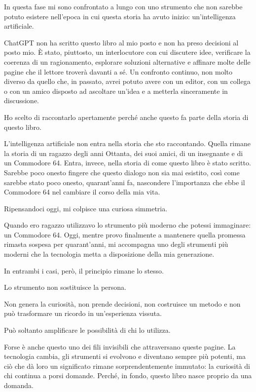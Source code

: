 \documentclass{article}
\begin{document}
In questa fase mi sono confrontato a lungo con uno strumento che non sarebbe potuto esistere nell'epoca in cui questa
storia ha avuto inizio: un'intelligenza artificiale.

ChatGPT non ha scritto questo libro al mio posto e non ha preso decisioni al posto mio. È stato, piuttosto, un
interlocutore con cui discutere idee, verificare la coerenza di un ragionamento, esplorare soluzioni alternative e
affinare molte delle pagine che il lettore troverà davanti a sé. Un confronto continuo, non molto diverso da quello
che, in passato, avrei potuto avere con un editor, con un collega o con un amico disposto ad ascoltare un'idea e a
metterla sinceramente in discussione.

Ho scelto di raccontarlo apertamente perché anche questo fa parte della storia di questo libro.

L'intelligenza artificiale non entra nella storia che sto raccontando. Quella rimane la storia di un ragazzo degli anni
Ottanta, dei suoi amici, di un insegnante e di un Commodore 64. Entra, invece, nella storia di come questo libro è
stato scritto. Sarebbe poco onesto fingere che questo dialogo non sia mai esistito, così come sarebbe stato poco
onesto, quarant'anni fa, nascondere l'importanza che ebbe il Commodore 64 nel cambiare il corso della mia vita.

Ripensandoci oggi, mi colpisce una curiosa simmetria.

Quando ero ragazzo utilizzavo lo strumento più moderno che potessi immaginare: un Commodore 64. Oggi, mentre provo
finalmente a mantenere quella promessa rimasta sospesa per quarant'anni, mi accompagna uno degli strumenti più moderni
che la tecnologia metta a disposizione della mia generazione.

In entrambi i casi, però, il principio rimane lo stesso.

Lo strumento non sostituisce la persona.

Non genera la curiosità, non prende decisioni, non costruisce un metodo e non può trasformare un ricordo in
un'esperienza vissuta.

Può soltanto amplificare le possibilità di chi lo utilizza.

Forse è anche questo uno dei fili invisibili che attraversano queste pagine. La tecnologia cambia, gli strumenti si
evolvono e diventano sempre più potenti, ma ciò che dà loro un significato rimane sorprendentemente immutato: la
curiosità di chi continua a porsi domande. Perché, in fondo, questo libro nasce proprio da una domanda.
\end{document}
